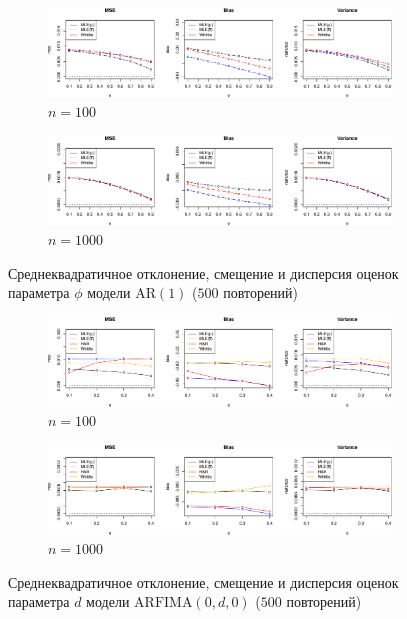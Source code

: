 \documentclass[specialist,
substylefile = spbu_report.rtx,
subf,href,colorlinks=true, 12pt]{disser}
\theoremstyle{definition}
\begin{document}
\begin{figure}[h!]
	\centering
	\begin{subfigure}{\textwidth}
		\includegraphics[width=\textwidth]{img/ar1_est_N100.pdf}
		\caption{$n=100$}
	\end{subfigure}
	\begin{subfigure}{\textwidth}
		\includegraphics[width=\textwidth]{img/ar1_est_N1000.pdf}
		\caption{$n=1000$}
	\end{subfigure}
	\caption{Среднеквадратичное отклонение, смещение и дисперсия оценок параметра $\phi$ модели $\mathrm{AR}(1)$ ($500$ повторений)}
	\label{fig:ar1_est}
\end{figure}
\begin{figure}[h!]
	\centering
	\begin{subfigure}{\textwidth}
		\includegraphics[width=\textwidth]{img/fi_est_N100.pdf}
		\caption{$n=100$}
	\end{subfigure}
	\begin{subfigure}{\textwidth}
		\includegraphics[width=\textwidth]{img/fi_est_N1000.pdf}
		\caption{$n=1000$}
	\end{subfigure}
	\caption{Среднеквадратичное отклонение, смещение и дисперсия оценок параметра $d$ модели $\mathrm{ARFIMA}(0, d, 0)$ ($500$ повторений)}
	\label{fig:fi_est}
\end{figure}
\end{document}
